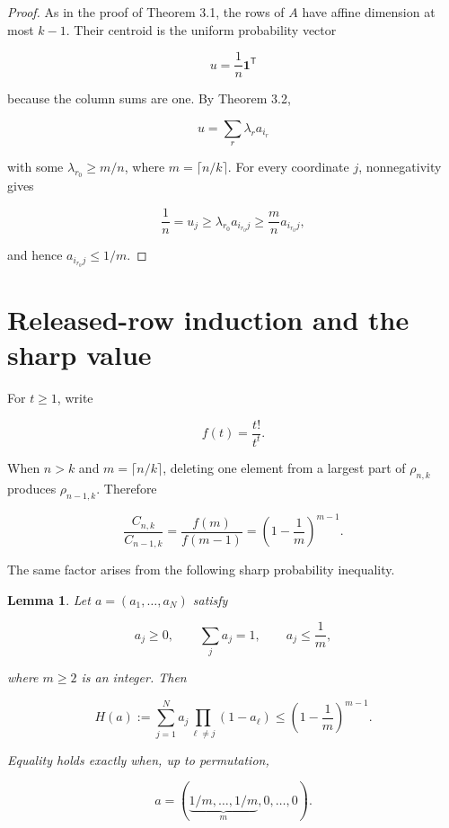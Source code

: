 \documentclass[11pt]{article}
\newtheorem{lemma}[theorem]{Lemma}
\theoremstyle{remark}
\begin{document}
\begin{proof}
As in the proof of Theorem 3.1, the rows of \(A\) have affine dimension at
most \(k-1\). Their centroid is the uniform probability vector

\[
 u=\frac1n\mathbf1^{\mathsf T}                              \tag{3.18}
\]

because the column sums are one. By Theorem 3.2,

\[
 u=\sum_r\lambda_r a_{i_r}
\]

with some \(\lambda_{r_0}\geq m/n\), where
\(m=\lceil n/k\rceil\). For every coordinate \(j\), nonnegativity gives

\[
 \frac1n=u_j
 \geq\lambda_{r_0}a_{i_{r_0}j}
 \geq\frac mn a_{i_{r_0}j},                               \tag{3.19}
\]

and hence \(a_{i_{r_0}j}\leq1/m\).
\end{proof}

\section{Released-row induction and the sharp value}

For \(t\geq1\), write

\[
 f(t)=\frac{t!}{t^t}.
\]

When \(n>k\) and \(m=\lceil n/k\rceil\), deleting one element from a largest
part of \(\rho_{n,k}\) produces \(\rho_{n-1,k}\). Therefore

\[
 \frac{C_{n,k}}{C_{n-1,k}}
 =\frac{f(m)}{f(m-1)}
 =\left(1-\frac1m\right)^{m-1}.                            \tag{4.1}
\]

The same factor arises from the following sharp probability inequality.

\begin{lemma}
Let
\(a=(a_1,\ldots,a_N)\) satisfy

\[
 a_j\geq0,
 \qquad \sum_j a_j=1,
 \qquad a_j\leq\frac1m,
\]

where \(m\geq2\) is an integer. Then

\[
 H(a):=\sum_{j=1}^N a_j\prod_{\ell\ne j}(1-a_\ell)
 \leq\left(1-\frac1m\right)^{m-1}.                        \tag{4.2}
\]

Equality holds exactly when, up to permutation,

\[
 a=(\underbrace{1/m,\ldots,1/m}_{m},0,\ldots,0).           \tag{4.3}
\]
\end{lemma}
\end{document}
